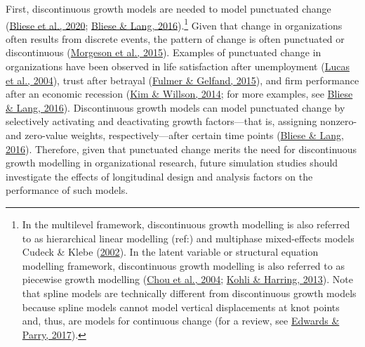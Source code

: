 \documentclass[
12pt, %
twoside,
english]{guelphthesis}
\begin{document}
First, discontinuous growth models are needed to model punctuated change (\protect\hyperlink{ref-bliese2020}{Bliese et al., 2020}; \protect\hyperlink{ref-bliese2016}{Bliese \& Lang, 2016}).\footnote{In the multilevel framework, discontinuous growth modelling is also referred to as hierarchical linear modelling (ref:) and multiphase mixed-effects models Cudeck \& Klebe (\protect\hyperlink{ref-cudeck2002}{2002}). In the latent variable or structural equation modelling framework, discontinuous growth modelling is also referred to as piecewise growth modelling (\protect\hyperlink{ref-chou2004}{Chou et al., 2004}; \protect\hyperlink{ref-kohli2013}{Kohli \& Harring, 2013}). Note that spline models are technically different from discontinuous growth models because spline models cannot model vertical displacements at knot points and, thus, are models for continuous change (for a review, see \protect\hyperlink{ref-edwards2017}{Edwards \& Parry, 2017}).} Given that change in organizations often results from discrete events, the pattern of change is often punctuated or discontinuous (\protect\hyperlink{ref-morgeson2015}{Morgeson et al., 2015}). Examples of punctuated change in organizations have been observed in life satisfaction after unemployment (\protect\hyperlink{ref-lucas2004}{Lucas et al., 2004}), trust after betrayal (\protect\hyperlink{ref-fulmer2015}{Fulmer \& Gelfand, 2015}), and firm performance after an economic recession (\protect\hyperlink{ref-kim2014b}{Kim \& Willson, 2014}; for more examples, see \protect\hyperlink{ref-bliese2016}{Bliese \& Lang, 2016}). Discontinuous growth models can model punctuated change by selectively activating and deactivating growth factors---that is, assigning nonzero- and zero-value weights, respectively---after certain time points (\protect\hyperlink{ref-bliese2016}{Bliese \& Lang, 2016}). Therefore, given that punctuated change merits the need for discontinuous growth modelling in organizational research, future simulation studies should investigate the effects of longitudinal design and analysis factors on the performance of such models.
\end{document}
